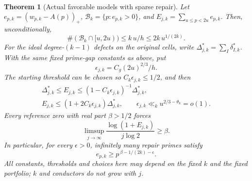 \documentclass[11pt]{article}
\newtheorem{theorem}{Theorem}[section]
\theoremstyle{definition}
\begin{document}
\begin{theorem}[Actual favorable models with sparse repair]
Let $e_{p,k}=(w_{p,k}-A(p))_+$,
$\mathcal B_k=\{p:e_{p,k}>0\}$, and
$E_{j,k}=\sum_{u\le p<2u}e_{p,k}$. Then, unconditionally,
\begin{equation}
 \#(\mathcal B_k\cap[u,2u))\le k\,u/h
                           \le2k\,u^{1/(2k)}.
 \label{eq:sparse-prime-repair-count}
\end{equation}
For the ideal degree-$(k-1)$ defects on the original cells,
write $\Delta_{j,k}^*=\sum_I\delta_{I,k}^*$. With the same
fixed prime-gap constants as above, put
\[
 \epsilon_{j,k}=C_g(2u)^{2/3}/h.
\]
The starting threshold can be chosen so $C_k\epsilon_{j,k}\le1/2$,
and then
\begin{equation}
 \begin{gathered}
 \Delta_{j,k}^*\le E_{j,k}
              \le(1-C_k\epsilon_{j,k})^{-1}\Delta_{j,k}^*,\\
 E_{j,k}\le(1+2C_k\epsilon_{j,k})\Delta_{j,k}^*,
 \qquad \epsilon_{j,k}\ll_k u^{2/3-\theta_k}=o(1).
 \end{gathered}
 \label{eq:higher-moment-full-capacity-consumer}
\end{equation}
Every reference zero with real part $\beta>1/2$ forces
\begin{equation}
 \limsup_{j\to\infty}
       \frac{\log(1+E_{j,k})}{j\log2}\ge\beta.
 \label{eq:sparse-repair-zero-signal}
\end{equation}
In particular, for every $\epsilon>0$, infinitely many repair
primes satisfy
\begin{equation}
 e_{p,k}\ge p^{\,\beta-1/(2k)-\epsilon}.
 \label{eq:sparse-repair-heavy-atom}
\end{equation}
All constants, thresholds and choices here may depend on
the fixed $k$ and the fixed portfolio; $k$ and conductors
do not grow with $j$.
\end{theorem}
\end{document}
